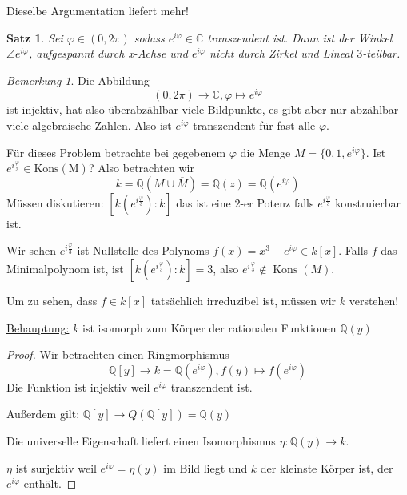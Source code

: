 \documentclass[a4paper,12pt,numbers=noenddot,parskip=full]{scrartcl}
\newcommand{\setQ}{\mathbb{Q}}
\newcommand{\setC}{\mathbb{C}}
\newcommand{\heading}{\underline}
\theoremstyle{dotless}
\newtheorem{theorem}{Satz}[section]
\theoremstyle{remark}
\newtheorem*{remark}{Bemerkung}
\begin{document}
	Dieselbe Argumentation liefert mehr!
	
	\begin{theorem}
		Sei $\varphi \in (0,2\pi)$ sodass $e^{i \varphi} \in \setC$ transzendent ist. Dann ist der Winkel $\angle e^{i\varphi}$, aufgespannt durch x-Achse und $e^{i\varphi}$ nicht durch Zirkel und Lineal $3$-teilbar.
	\end{theorem}

	\begin{remark}
		Die Abbildung
		\begin{equation*}
			(0, 2\pi) \to \setC, \varphi \mapsto e^{i \varphi}
		\end{equation*}
		ist injektiv, hat also überabzählbar viele Bildpunkte, es gibt aber nur abzählbar viele algebraische Zahlen. Also ist $e^{i \varphi}$ transzendent für fast alle $\varphi$.
	\end{remark}

	Für dieses Problem betrachte bei gegebenem $\varphi$ die Menge $M = \{ 0, 1, e^{i \varphi} \}$. Ist $e^{i \frac{\varphi}{3}} \in \operatorname{Kons(M)}$? Also betrachten wir
	\begin{equation*}
		k = \setQ(M \cup \overline{M}) = \setQ(z) = \setQ(e^{i \varphi})
	\end{equation*}
	Müssen diskutieren: $[k(e^{i \frac{\varphi}{3}}): k]$ das ist eine $2$-er Potenz falls $e^{i \frac{\varphi}{3}}$ konstruierbar ist.
	
	Wir sehen $e^{i \frac{\varphi}{3}}$ ist Nullstelle des Polynoms $f(x) = x^3 - e^{i \varphi} \in k[x]$. Falls $f$ das Minimalpolynom ist, ist $[k(e^{i \frac{\varphi}{3}}): k] = 3$, also $e^{i \frac{\varphi}{3}} \notin \operatorname{Kons}(M)$.
	
	Um zu sehen, dass $f \in k[x]$ tatsächlich irreduzibel ist, müssen wir $k$ verstehen!
	
	\heading{Behauptung:} $k$ ist isomorph zum Körper der rationalen Funktionen $\setQ(y)$
	
	\begin{proof}
		Wir betrachten einen Ringmorphismus
		\begin{equation*}
			\setQ[y] \to k = \setQ(e^{i \varphi}), f(y) \mapsto f(e^{i \varphi})
		\end{equation*}
		Die Funktion ist injektiv weil $e^{i \varphi}$ transzendent ist.
		
		Außerdem gilt: $\setQ[y] \to Q(\setQ[y]) = \setQ(y)$
		
		Die universelle Eigenschaft liefert einen Isomorphismus $\eta: \setQ(y) \to k$.
		
		$\eta$ ist surjektiv weil $e^{i \varphi} = \eta(y)$ im Bild liegt und $k$ der kleinste Körper ist, der $e^{i \varphi}$ enthält.
	\end{proof}
\end{document}
